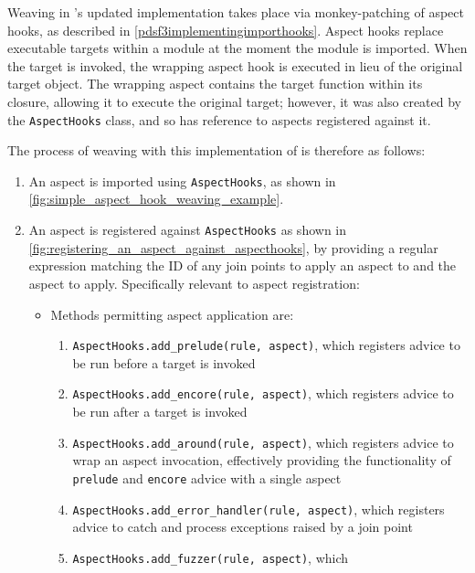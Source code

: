 
Weaving in \pdsf{}'s updated implementation takes place via monkey-patching of
aspect hooks, as described in \cref{pdsf3implementingimporthooks}. Aspect hooks
replace executable targets within a module at the moment the module is imported.
When the target is invoked, the wrapping aspect hook is executed in lieu of the
original target object. The wrapping aspect contains the target function within
its closure, allowing it to execute the original target; however, it was also
created by the \lstinline{AspectHooks} class, and so has reference to aspects
registered against it. 

The process of weaving with this implementation of \pdsf is therefore as
follows:

\begin{enumerate}\label{urgency_mentioned_in_passing}
    \item An aspect is imported using \lstinline{AspectHooks}, as shown in
    \cref{fig:simple_aspect_hook_weaving_example}.
    \item An aspect is registered against \lstinline{AspectHooks} as shown in
    \cref{fig:registering_an_aspect_against_aspecthooks}, by providing a regular
    expression matching the ID of any join points to apply an aspect to and the
    aspect to apply. Specifically relevant to aspect registration:
    \begin{itemize}
        \item Methods permitting aspect application are:
        \begin{enumerate}
            \item \lstinline{AspectHooks.add_prelude(rule, aspect)}, which
            registers advice to be run before a target is invoked
            \item \lstinline{AspectHooks.add_encore(rule, aspect)}, which
            registers advice to be run after a target is invoked
            \item \lstinline{AspectHooks.add_around(rule, aspect)}, which
            registers advice to wrap an aspect invocation, effectively providing
            the functionality of \lstinline{prelude} and \lstinline{encore}
            advice with a single aspect
            \item \lstinline{AspectHooks.add_error_handler(rule, aspect)}, which
            registers advice to catch and process exceptions raised by a join
            point
            \item \lstinline{AspectHooks.add_fuzzer(rule, aspect)}, which

\end{enumerate}
\end{itemize}
\end{enumerate}
